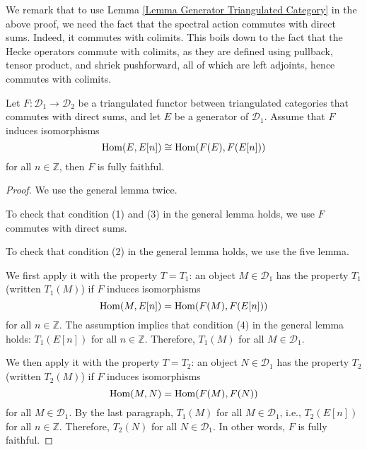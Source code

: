 \begin{remark}
	We remark that to use Lemma \ref{Lemma Generator Triangulated Category} in the above proof, we need the fact that the spectral action commutes with direct sums. Indeed, it commutes with colimits. This boils down to the fact that the Hecke operators commute with colimits, as they are defined using pullback, tensor product, and shriek pushforward, all of which are left adjoints, hence commutes with colimits.
\end{remark}



\begin{lemma}\label{Lemma Generator Triangulated Category}
	Let $F: \mathcal{D}_1 \to \mathcal{D}_2$ be a triangulated functor between triangulated categories that commutes with direct sums, and let $E$ be a generator of $\mathcal{D}_1$. Assume that $F$ induces isomorphisms
	$$\operatorname{\operatorname{Hom}}(E, E[n]) \cong \operatorname{\operatorname{Hom}}(F(E), F(E[n]))$$
	for all $n \in \mathbb{Z}$, then $F$ is fully faithful.
\end{lemma}

\begin{proof}
	We use the general lemma \cite[Stack, Tag 0ATH]{stacks-project} twice. 
	
	To check that condition (1) and (3) in the general lemma holds, we use $F$ commutes with direct sums.
	
	To check that condition (2) in the general lemma holds, we use the five lemma.
	
	We first apply it with the property $T=T_1$: an object $M \in \mathcal{D}_1$ has the property $T_1$ (written $T_1(M)$) if $F$ induces isomorphisms
	$$\operatorname{\operatorname{Hom}}(M, E[n])=\operatorname{\operatorname{Hom}}(F(M), F(E[n]))$$
	for all $n \in \mathbb{Z}$. The assumption implies that condition (4) in the general lemma holds: $T_1(E[n])$ for all $n \in \mathbb{Z}$. Therefore, $T_1(M)$ for all $M \in \mathcal{D}_1$.
	
	We then apply it with the property $T=T_2$: an object $N \in \mathcal{D}_1$ has the property $T_2$ (written $T_2(M)$) if $F$ induces isomorphisms
	$$\operatorname{\operatorname{Hom}}(M, N)=\operatorname{\operatorname{Hom}}(F(M), F(N))$$
	for all $M \in \mathcal{D}_1$. By the last paragraph, $T_1(M)$ for all $M \in \mathcal{D}_1$, i.e., $T_2(E[n])$ for all $n \in \mathbb{Z}$. Therefore, $T_2(N)$ for all $N \in \mathcal{D}_1$. In other words, $F$ is fully faithful.
\end{proof}

